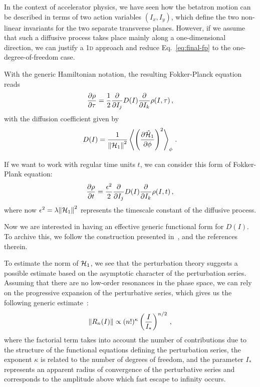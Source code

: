 In the context of accelerator physics, we have seen how the betatron motion can be described in terms of two action variables $(I_x, I_y)$, which define the two non-linear invariants for the two separate transverse planes. However, if we assume that such a diffusive process takes place mainly along a one-dimensional direction, we can justify a 1\textsc{d} approach and reduce Eq.~\eqref{eq:final-fp} to the one-degree-of-freedom case.

With the generic Hamiltonian notation, the resulting Fokker-Planck equation reads
\begin{equation}
    \pdv{\rho}{\tau}=\frac{1}{2}\pdv{}{I_j} D(I) \pdv{}{I_k}\rho(I,\tau)\,,
\end{equation}
with the diffusion coefficient given by
\begin{equation}
    D(I) = \frac{1}{\norm{\mathcal{H}_1}^2} \left\langle \left( \pdv{\hat{\mathcal{H}}_1}{\phi} \right)^2 \right\rangle_\phi \,.
\end{equation}

If we want to work with regular time units $t$, we can consider this form of Fokker-Plank equation:
\begin{equation}
    \pdv{\rho}{t}=\frac{\epsilon^2}{2}\pdv{}{I_j} D(I) \pdv{}{I_k}\rho(I,t)\,,
    \label{eq:fp}
\end{equation}
where now $\epsilon^2 = \lambda\norm{\mathcal{H}_1}^2$ represents the timescale constant of the diffusive process.

Now we are interested in having an effective generic functional form for $D(I)$. To archive this, we follow the construction presented in~\cite{Bazzani:2019lse}, and the references therein.

To estimate the norm of $\mathcal{H}_1$, we see that the perturbation theory suggests a possible estimate based on the asymptotic character of the perturbation series. Assuming that there are no low-order resonances in the phase space, we can rely on the progressive expansion of the perturbative series, which gives us the following generic estimate~\cite{Bazzani:1990aa}:
\begin{equation}
    \norm{R_n(I)} \propto (n!)^\kappa \left(\frac{I}{I_\ast}\right)^{n/2}\,,
\end{equation}
where the factorial term takes into account the number of contributions due to the structure of the functional equations defining the perturbation series, the exponent $\kappa$ is related to the number of degrees of freedom, and the parameter $I_\ast$ represents an apparent radius of convergence of the perturbative series and corresponds to the amplitude above which fast escape to infinity occurs.

